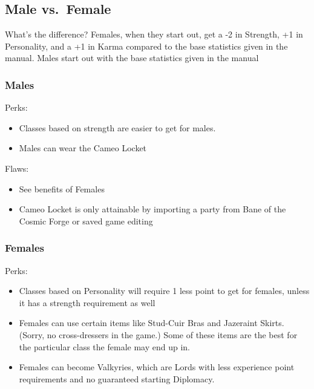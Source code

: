 \documentclass[12pt]{article}
\providecommand{\tightlist}{%
  \setlength{\itemsep}{0pt}\setlength{\parskip}{0pt}}
\begin{document}
\subsection{Male vs.~Female}\label{male-vs.female}

What's the difference? Females, when they start out, get a -2 in
Strength, +1 in Personality, and a +1 in Karma compared to the base
statistics given in the manual. Males start out with the base statistics
given in the manual

\subsubsection{Males}\label{males}

Perks:

\begin{itemize}
\tightlist
\item
  Classes based on strength are easier to get for males.
\item
  Males can wear the Cameo Locket
\end{itemize}

Flaws:

\begin{itemize}
\item
  See benefits of Females
\item
  Cameo Locket is only attainable by importing a party from Bane of the
  Cosmic Forge or saved game editing
\end{itemize}

\subsubsection{Females}\label{females}

Perks:

\begin{itemize}
\tightlist
\item
  Classes based on Personality will require 1 less point to get for
  females, unless it has a strength requirement as well
\item
  Females can use certain items like Stud-Cuir Bras and Jazeraint
  Skirts. (Sorry, no cross-dressers in the game.) Some of these items
  are the best for the particular class the female may end up in.
\item
  Females can become Valkyries, which are Lords with less experience
  point requirements and no guaranteed starting Diplomacy.
\end{itemize}
\end{document}
